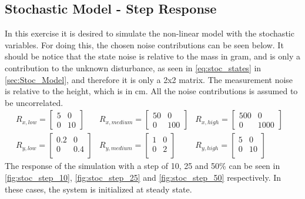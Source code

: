 \subsection{Stochastic Model - Step Response}
In this exercise it is desired to simulate the non-linear model with the stochastic variables. For doing this, the chosen noise contributions can be seen below. It should be notice that the state noise is relative to the mass in gram, and is only a contribution to the unknown disturbance, as seen in \cref{eq:stoc_states} in \cref{sec:Stoc_Model}, and therefore it is only a 2x2 matrix. The measurement noise is relative to the height, which is in cm. All the noise contributions is assumed to be uncorrelated.
\begin{equation}
    \begin{matrix}
        R_{x,low} =\begin{bmatrix}
             5 & 0\\
             0 & 10
        \end{bmatrix} &
        R_{x,medium} =\begin{bmatrix}
            50 & 0\\
            0 & 100
        \end{bmatrix} &
        R_{x,high} =\begin{bmatrix}
            500 & 0\\
            0 & 1000
        \end{bmatrix} \\
        R_{y,low} =\begin{bmatrix}
             0.2 & 0 \\
             0 & 0.4 \\
        \end{bmatrix} &
        R_{y,medium} =\begin{bmatrix}
             1 & 0 \\
             0 & 2 \\
        \end{bmatrix} &
        R_{y,high} =\begin{bmatrix}
             5 & 0 \\
             0 & 10 \\
        \end{bmatrix} &
    \end{matrix}
    \label{eq:Noise_values}
\end{equation}
The response of the simulation with a step of 10, 25 and 50\% can be seen in \cref{fig:stoc_step_10}, \cref{fig:stoc_step_25} and \cref{fig:stoc_step_50} respectively. In these cases, the system is initialized at steady state.
